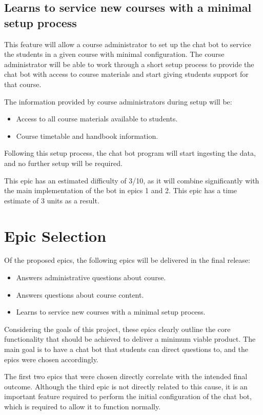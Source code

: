 \documentclass{article}
\begin{document}
\subsection{Learns to service new courses with a minimal setup process}

This feature will allow a course administrator to set up the chat bot to service the students in a given course with minimal configuration. The course administrator will be able to work through a short setup process to provide the chat bot with access to course materials and start giving students support for that course. 

The information provided by course administrators during setup will be:
\begin{itemize}
  \item Access to all course materials available to students.
  \item Course timetable and handbook information.
\end{itemize}

Following this setup process, the chat bot program will start ingesting the data, and no further setup will be required.

This epic has an estimated difficulty of 3/10, as it will combine significantly with the main implementation of the bot in epics 1 and 2. This epic has a time estimate of 3 units as a result. 

\section{Epic Selection}

Of the proposed epics, the following epics will be delivered in the final release:
\begin{itemize}
  \item Answers administrative questions about course.
  \item Answers questions about course content.
  \item Learns to service new courses with a minimal setup process.
\end{itemize}

Considering the goals of this project, these epics clearly outline the core functionality that should be achieved to deliver a minimum viable product. The main goal is to have a chat bot that students can direct questions to, and the epics were chosen accordingly.

The first two epics that were chosen directly correlate with the intended final outcome. Although the third epic is not directly related to this cause, it is an important feature required to perform the initial configuration of the chat bot, which is required to allow it to function normally.
\end{document}
